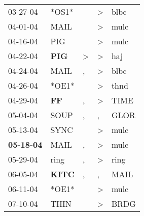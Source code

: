 \begin{supertabular}{p{0.07\textwidth}p{0.06\textwidth}p{0.02\textwidth}p{0.02\textwidth}p{0.06\textwidth}}
          03-27-04\textsuperscript{} &                            *OS1* &                  &     \textgreater &           blbc\textsuperscript{} \\
          04-01-04\textsuperscript{} &           MAIL\textsuperscript{} &                  &     \textgreater &           mulc\textsuperscript{} \\
          04-16-04\textsuperscript{} &            PIG\textsuperscript{} &                  &     \textgreater &           mulc\textsuperscript{} \\
          04-22-04\textsuperscript{} &   \textbf{PIG\textsuperscript{}} &     \textgreater &     \textgreater &            haj\textsuperscript{} \\
          04-24-04\textsuperscript{} &           MAIL\textsuperscript{} &                , &     \textgreater &           blbc\textsuperscript{} \\
          04-26-04\textsuperscript{} &                            *OE1* &                  &     \textgreater &           thnd\textsuperscript{} \\
          04-29-04\textsuperscript{} &    \textbf{FF\textsuperscript{}} &                , &     \textgreater &           TIME\textsuperscript{} \\
          05-04-04\textsuperscript{} &           SOUP\textsuperscript{} &                , &                , &           GLOR\textsuperscript{} \\
          05-13-04\textsuperscript{} &           SYNC\textsuperscript{} &                  &     \textgreater &           mulc\textsuperscript{} \\
 \textbf{05-18-04\textsuperscript{}} &           MAIL\textsuperscript{} &                , &     \textgreater &           mulc\textsuperscript{} \\
          05-29-04\textsuperscript{} &           ring\textsuperscript{} &                , &     \textgreater &           ring\textsuperscript{} \\
          06-05-04\textsuperscript{} &  \textbf{KITC\textsuperscript{}} &                , &                , &           MAIL\textsuperscript{} \\
          06-11-04\textsuperscript{} &                            *OE1* &                  &     \textgreater &           mulc\textsuperscript{} \\
          07-10-04\textsuperscript{} &           THIN\textsuperscript{} &                  &     \textgreater &           BRDG\textsuperscript{} \\

\end{supertabular}
